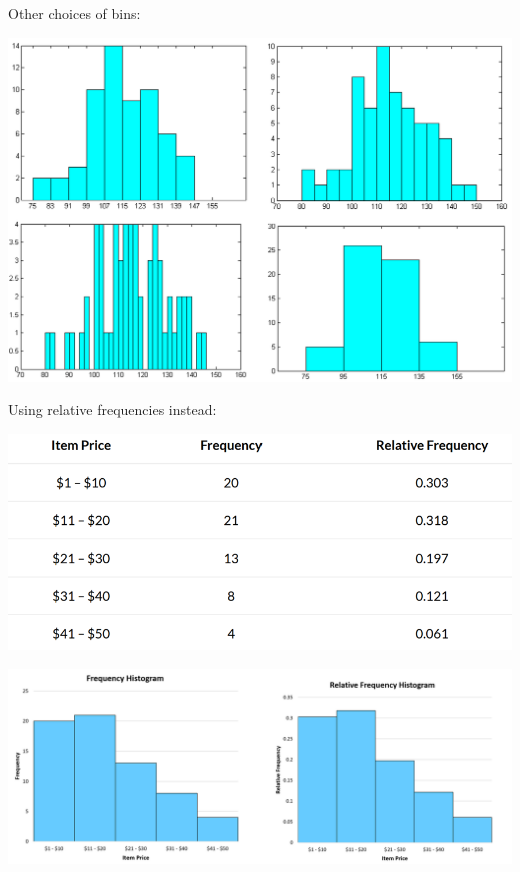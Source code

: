 \documentclass[11pt,letterpaper,twoside]{article}
\begin{document}
\newpage

Other choices of bins:

\begin{center}
\includegraphics[scale=0.7]{images/hist3.png}
\end{center}

Using relative frequencies instead:

\begin{center}
\includegraphics[scale=0.8]{images/prices.png}
\end{center}

\begin{center}
\includegraphics[scale=0.8]{images/hists.png}
\end{center}
\end{document}
